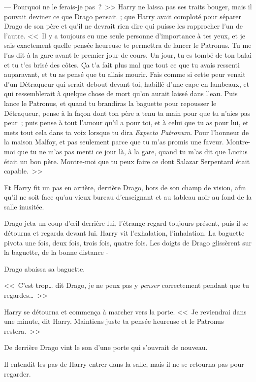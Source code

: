 --- Pourquoi ne le ferais-je pas~?~>> Harry ne laissa pas ses traits bouger, mais il pouvait deviner ce que Drago pensait~; que Harry avait comploté pour séparer Drago de son père et qu'il ne devrait rien dire qui puisse les rapprocher l'un de l'autre. <<~Il y a toujours eu une seule personne d'importance à tes yeux, et je sais exactement quelle pensée heureuse te permettra de lancer le Patronus. Tu me l'as dit à la gare avant le premier jour de cours. Un jour, tu es tombé de ton balai et tu t'es brisé des côtes. Ça t'a fait plus mal que tout ce que tu avais ressenti auparavant, et tu as pensé que tu allais mourir. Fais comme si cette peur venait d'un Détraqueur qui serait debout devant toi, habillé d'une cape en lambeaux, et qui ressemblerait à quelque chose de mort qu'on aurait laissé dans l'eau. Puis lance le Patronus, et quand tu brandiras la baguette pour repousser le Détraqueur, pense à la façon dont ton père a tenu ta main pour que tu n'aies pas peur~; puis pense à tout l'amour qu'il a pour toi, et à celui que tu as pour lui, et mets tout cela dans ta voix lorsque tu dira \emph{Expecto Patronum}. Pour l'honneur de la maison Malfoy, et pas seulement parce que tu m'as promis une faveur. Montre-moi que tu ne m'as pas menti ce jour là, à la gare, quand tu m'as dit que Lucius était un bon père. Montre-moi que tu peux faire ce dont Salazar Serpentard était capable.~>>

Et Harry fit un pas en arrière, derrière Drago, hors de son champ de vision, afin qu'il ne soit face qu'au vieux bureau d'enseignant et au tableau noir au fond de la salle inusitée.

Drago jeta un coup d'œil derrière lui, l'étrange regard toujours présent, puis il se détourna et regarda devant lui. Harry vit l'exhalation, l'inhalation. La baguette pivota une fois, deux fois, trois fois, quatre fois. Les doigts de Drago glissèrent sur la baguette, de la bonne distance -

Drago abaissa sa baguette.

<<~C'est trop… dit Drago, je ne peux pas y \emph{penser} correctement pendant que tu regardes…~>>

Harry se détourna et commença à marcher vers la porte. <<~Je reviendrai dans une minute, dit Harry. Maintiens juste ta pensée heureuse et le Patronus restera.~>>

\later

De derrière Drago vint le son d'une porte qui s'ouvrait de nouveau.

Il entendit les pas de Harry entrer dans la salle, mais il ne se retourna pas pour regarder.


